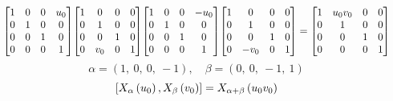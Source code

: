 \documentclass[11pt]{article}
\theoremstyle{definition}
\begin{document}
\[
\scaletoalign{\textwidth}{{\left[\begin{matrix}1 & 0 & 0 & u_{0}\\0 & 1 & 0 & 0\\0 & 0 & 1 & 0\\0 & 0 & 0 & 1\end{matrix}\right]} {\left[\begin{matrix}1 & 0 & 0 & 0\\0 & 1 & 0 & 0\\0 & 0 & 1 & 0\\0 & v_{0} & 0 & 1\end{matrix}\right]} {\left[\begin{matrix}1 & 0 & 0 & - u_{0}\\0 & 1 & 0 & 0\\0 & 0 & 1 & 0\\0 & 0 & 0 & 1\end{matrix}\right]} {\left[\begin{matrix}1 & 0 & 0 & 0\\0 & 1 & 0 & 0\\0 & 0 & 1 & 0\\0 & - v_{0} & 0 & 1\end{matrix}\right]} = {\left[\begin{matrix}1 & u_{0} v_{0} & 0 & 0\\0 & 1 & 0 & 0\\0 & 0 & 1 & 0\\0 & 0 & 0 & 1\end{matrix}\right]}}
\]
\[
\alpha = \left( 1, \  0, \  0, \  -1\right), \quad \beta = \left( 0, \  0, \  -1, \  1\right)
\]
\[
\scaletoalign{\textwidth}{\left[ X_{\alpha}\left(u_{0}\right), X_{\beta}\left(v_{0}\right) \right] = X_{\alpha + \beta}\left(u_{0} v_{0}\right)}
\]
\end{document}
